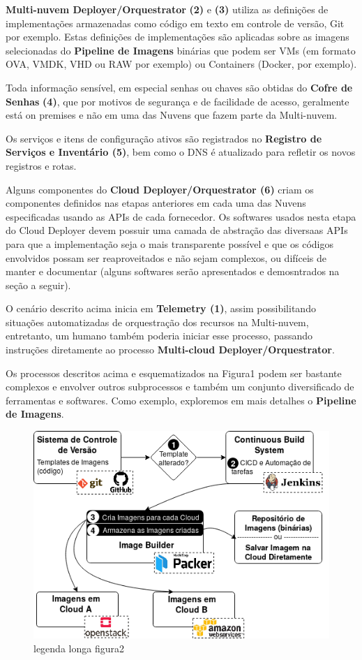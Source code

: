 \documentclass[12pt]{article}
\begin{document}
	\textbf{Multi-nuvem Deployer/Orquestrator} \textbf{(2)} e \textbf{(3)} utiliza as definições de implementações armazenadas como código em texto em controle de versão, Git por exemplo. Estas definições de implementações são aplicadas sobre as imagens selecionadas do \textbf{Pipeline de Imagens} binárias que podem ser VMs (em formato OVA, VMDK, VHD ou RAW por exemplo) ou Containers (Docker, por exemplo).
	
	Toda informação sensível, em especial senhas ou chaves são obtidas do \textbf{Cofre de Senhas} \textbf{(4)}, que por motivos de segurança e de facilidade de acesso, geralmente está on premises e não em uma das Nuvens que fazem parte da Multi-nuvem.   
	
	Os serviços e itens de configuração ativos são registrados no \textbf{Registro de Serviços e Inventário (5)}, bem como o DNS é atualizado para refletir os novos registros e rotas.
	
	Alguns componentes do \textbf{Cloud Deployer/Orquestrator (6)} criam os componentes definidos nas etapas anteriores em cada uma das Nuvens especificadas usando as APIs de cada fornecedor. Os softwares usados nesta etapa do Cloud Deployer devem possuir uma camada de abstração das diversaas APIs para que a implementação seja o mais transparente possível e que os códigos envolvidos possam ser reaproveitados e não sejam complexos, ou difíceis de manter e documentar (alguns softwares serão apresentados e demosntrados na seção a seguir).  

	O cenário descrito acima inicia em \textbf{Telemetry (1)}, assim possibilitando situações automatizadas de orquestração dos recursos na Multi-nuvem, entretanto, um humano também poderia iniciar esse processo, passando instruções diretamente ao processo \textbf{Multi-cloud Deployer/Orquestrator}.  
	
	Os processos descritos acima e esquematizados na Figura1 podem ser bastante complexos e envolver outros subprocessos e também um conjunto diversificado de ferramentas e softwares. Como exemplo, exploremos em mais detalhes o \textbf{Pipeline de Imagens}.
		
    \begin{figure}[H]
    	\centering
    	\includegraphics[width=0.7\linewidth]{figuras/Figure2.png}
    	\caption{legenda longa figura2}
    	\label{fig:figure2}
    \end{figure}
    
\end{document}
